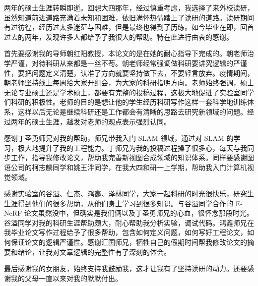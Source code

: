 
\begin{acknowledgements}
  两年的硕士生涯转瞬即逝。回想大四那年，经过慎重考虑，我选择了来外校读研，虽然知道前进道路充满着未知和困难，依旧满怀热情踏上了读研的道路。读研期间有过彷徨，经历过太多迷茫与困难，但是最终也得到了历练。如今毕业在即，回首过去的两年，发现许多人都给予了我很大的帮助。特在此进行由衷的感谢。
  
  首先要感谢我的导师朝红阳教授，本论文的是在她的耐心指导下完成的。朝老师治学严谨，对待科研从来都是一丝不苟。朝老师经常强调做科研要讲究逻辑的严谨性，要把问题定义清楚，认准了方向就要坚持做下去，不要轻言放弃。疫情期间，朝老师坚持线上每周给大家开组会，为大家的科研指明方向。老师始终强调，硕士无论专业硕士还是学术硕士，都要有完整的投稿过程，这极大地促进了实验室同学们科研的积极性。老师的目的是想让他的学生经历科研写作这样一套科学地训练体系，这样以后无论是继续科研还是工作都会有清晰的思路去研究新领域的问题。经过两年的硕士生涯，越发对老师的观点表示强烈认同。
  
  感谢丁圣勇师兄对我的帮助，师兄带我入门 SLAM 领域，通过对 SLAM 的学习，极大地提升了我的工程能力。丁师兄为我的投稿过程操了很多心，每天与我同步工作，指导我修改论文，帮助我完善新视图合成领域的知识体系。同样要感谢图语公司的柯志麟同学和姚王泮同学，在我大四和研一上学期，帮助我入门计算机视觉领域。
  
  感谢实验室的谷溢、仁杰、鸿鑫、泽林同学，大家一起科研的时光很快乐，研究生生涯得到他们的很多帮助，从他们身上学习到很多知识。与谷溢同学合作的 E-NeRF 论文虽然没中，但确实是我们俩以及丁圣勇师兄的心血，很怀念那段时光。谷溢同学对我的科研生涯帮助颇大，耐心帮助我分析实验，调试代码。鸿鑫师兄在我毕业论文写作过程给予了很多帮助，包含如何定义问题，如何写好工程论文，如何保证论文的逻辑严谨性。感谢汇国师兄，牺牲自己的假期时间帮我修改论文的摘要和绪论，让我对文章逻辑的完整性有了深刻的体会。
  
  最后感谢我的女朋友，始终支持我鼓励我，这才让我有了坚持读研的动力。还要感谢我的父母一直以来对我的默默付出。
\end{acknowledgements}

